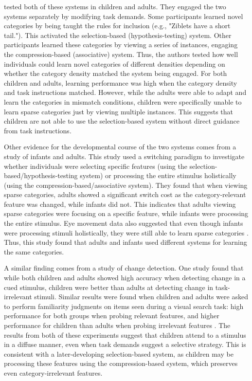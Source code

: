 \documentclass[../dissertation.tex]{subfiles}
\begin{document}
	\citet{Kloos2008} tested both of these systems in children and adults. They engaged the two systems separately by modifying task demands. Some participants learned novel categories by being taught the rules for inclusion (e.g., "Ziblets have a short tail."). This activated the selection-based (hypothesis-testing) system. Other participants learned these categories by viewing a series of instances, engaging the compression-based (associative) system. Thus, the authors tested how well individuals could learn novel categories of different densities depending on whether the category density matched the system being engaged. For both children and adults, learning performance was high when the category density and task instructions matched. However, while the adults were able to adapt and learn the categories in mismatch conditions, children were specifically unable to learn sparse categories just by viewing multiple instances. This suggests that children are not able to use the selection-based system without direct guidance from task instructions. \par
	Other evidence for the developmental course of the two systems comes from a study of infants and adults. This study used a switching paradigm to investigate whether individuals were selecting specific features (using the selection-based/hypothesis-testing system) or processing the entire stimulus holistically (using the compression-based/associative system). They found that when viewing sparse categories, adults showed a significant switch cost as the category-relevant feature was changed, while infants did not. This indicates that adults viewing sparse categories were focusing on a specific feature, while infants were processing the entire stimulus. Eye movement data also suggested that even though infants were processing stimuli holistically, they were still able to learn sparse categories \citep{Best2013}. Thus, this study found that adults and infants used different systems for learning the same categories. \par
	A similar finding comes from a study of change detection. One study found that while both children and adults showed high accuracy when detecting change in a cued stimulus, children were better than adults at detecting change in task-irrelevant stimuli. Similar results were found when children and adults were asked to perform familiarity judgments on items seen during a visual search task: high performance for both groups when probing relevant features, and higher performance for children than adults when probing irrelevant features \citep{Plebanek2017}. The results from both of these experiments suggest that children attend to a stimulus in a diffuse manner, even when task demands suggest a selective strategy. This is consistent with a later-developing selection-based system, as children may be processing these features using the compression-based system, which preserves even category-irrelevant features. \par
\end{document}
